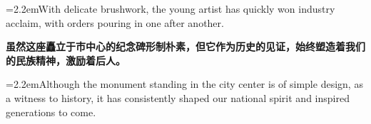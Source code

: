 \documentclass[11pt,a4paper]{article}
\newcommand{\num}[1]{\makebox[1.9em][r]{#1.}\hspace{0.3em}}
\begin{document}
\noindent\hangindent=2.2em\hspace{2.2em}With delicate brushwork, the young artist has quickly won industry acclaim, with orders pouring in one after another.

\num{5}\textbf{虽然这座矗立于市中心的纪念碑形制朴素，但它作为历史的见证，始终塑造着我们的民族精神，激励着后人。}

\vspace{0.15em}

\noindent\hangindent=2.2em\hspace{2.2em}Although the monument standing in the city center is of simple design, as a witness to history, it has consistently shaped our national spirit and inspired generations to come.
\end{document}
